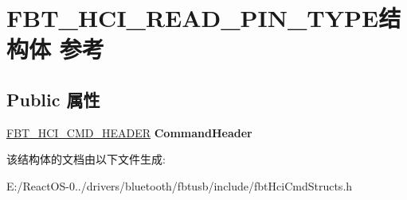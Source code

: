 \hypertarget{struct_f_b_t___h_c_i___r_e_a_d___p_i_n___t_y_p_e}{}\section{F\+B\+T\+\_\+\+H\+C\+I\+\_\+\+R\+E\+A\+D\+\_\+\+P\+I\+N\+\_\+\+T\+Y\+P\+E结构体 参考}
\label{struct_f_b_t___h_c_i___r_e_a_d___p_i_n___t_y_p_e}
\subsection*{Public 属性}
\begin{DoxyCompactItemize}
\item 
\mbox{\label{struct_f_b_t___h_c_i___r_e_a_d___p_i_n___t_y_p_e_a966e1172754a4ecf91a3240c0087ea1e}} 
\hyperlink{struct_f_b_t___h_c_i___c_m_d___h_e_a_d_e_r}{F\+B\+T\+\_\+\+H\+C\+I\+\_\+\+C\+M\+D\+\_\+\+H\+E\+A\+D\+ER} {\bfseries Command\+Header}
\end{DoxyCompactItemize}


该结构体的文档由以下文件生成\+:\begin{DoxyCompactItemize}
\item 
E\+:/\+React\+O\+S-\/0../drivers/bluetooth/fbtusb/include/fbt\+Hci\+Cmd\+Structs.\+h\end{DoxyCompactItemize}
